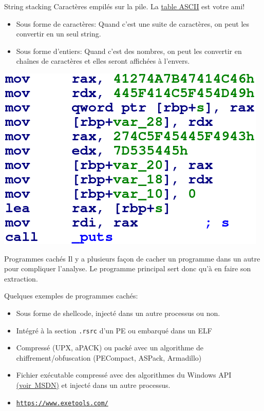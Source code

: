 \documentclass[10pt,xcolor={table,dvipsnames},t]{beamer}
\begin{document}
\begin{frame}{String stacking}
    Caractères empilés sur la pile. La \href{http://www.asciitable.com/}{table ASCII} est votre ami!
    \begin{itemize}
        \item Sous forme de caractères: Quand c'est une suite de caractères, on peut les convertir en un seul string. 
        \item Sous forme d'entiers: Quand c'est des nombres, on peut les convertir en chaînes de caractères et elles seront affichées à l'envers.
    \end{itemize}

    \begin{center}
        \includegraphics[width=.44\textwidth,height=.46\textheight]{stringstack}
    \end{center}

\end{frame}

\begin{frame}{Programmes cachés}
    Il y a plusieurs façon de cacher un programme dans un autre pour compliquer l'analyse. Le programme principal sert donc qu'à en faire son extraction.
    
    Quelques exemples de programmes cachés:
    \begin{itemize}
        \item Sous forme de shellcode, injecté dans un autre processus ou non.
        \item Intégré à la section \texttt{.rsrc} d'un PE ou embarqué dans un ELF
        \item Compressé (UPX, aPACK) ou packé avec un algorithme de chiffrement/obfuscation (PECompact, ASPack, Armadillo)
        \item Fichier exécutable compressé avec des algorithmes du Windows API \href{https://docs.microsoft.com/en-us/windows/win32/cmpapi/-compression-portal}{(voir MSDN)} et injecté dans un autre processus.
        \item \href{https://www.exetools.com/}{\texttt{https://www.exetools.com/}}
    \end{itemize}
\end{frame}
\end{document}
